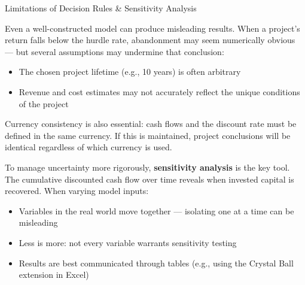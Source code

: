 \documentclass[10pt]{article}
\begin{document}
    \begin{core}{Limitations of Decision Rules \& Sensitivity Analysis}

      Even a well-constructed model can produce misleading results. When a project's return falls below the hurdle rate, abandonment may seem numerically obvious — but several assumptions may undermine that conclusion:

      \begin{itemize}

        \item The chosen project lifetime (e.g., 10 years) is often arbitrary

        \item Revenue and cost estimates may not accurately reflect the unique conditions of the project

      \end{itemize}

      Currency consistency is also essential: cash flows and the discount rate must be defined in the same currency. If this is maintained, project conclusions will be identical regardless of which currency is used.

      To manage uncertainty more rigorously, \textbf{sensitivity analysis} is the key tool. The cumulative discounted cash flow over time reveals when invested capital is recovered. When varying model inputs:

      \begin{itemize}

        \item Variables in the real world move together — isolating one at a time can be misleading

        \item Less is more: not every variable warrants sensitivity testing

        \item Results are best communicated through tables (e.g., using the Crystal Ball extension in Excel)

      \end{itemize}


\end{core}
\end{document}
